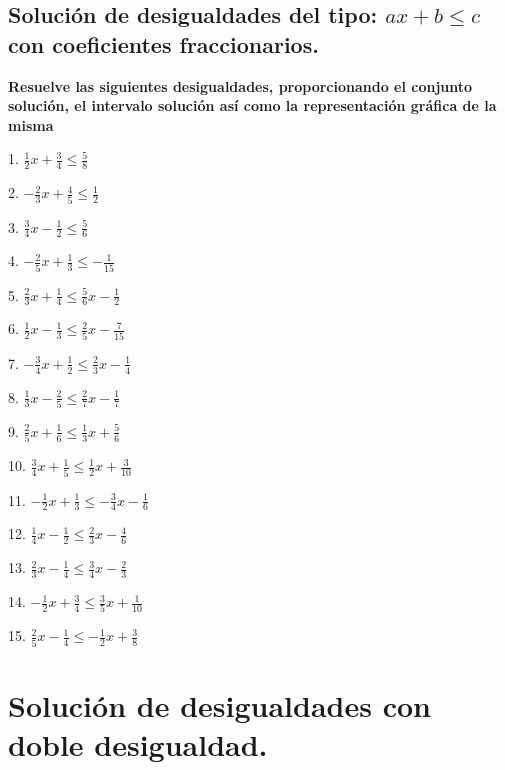 \documentclass[]{book}
\begin{document}
\subsection{\texorpdfstring{Solución de desigualdades del tipo:
\(ax+b \leq c\) con coeficientes
fraccionarios.}{Solución de desigualdades del tipo: ax+b \textbackslash{}leq c con coeficientes fraccionarios.}}\label{soluciuxf3n-de-desigualdades-del-tipo-axb-leq-c-con-coeficientes-fraccionarios.}

\textbf{Resuelve las siguientes desigualdades, proporcionando el
conjunto solución, el intervalo solución así como la representación
gráfica de la misma}

\begin{multicols}{3}
1. $\frac{1}{2}x + \frac{3}{4} \leq \frac{5}{8}$

2. $-\frac{2}{3}x + \frac{4}{5} \leq \frac{1}{2}$

3. $\frac{3}{4}x - \frac{1}{2} \leq \frac{5}{6}$

4. $-\frac{2}{5}x + \frac{1}{3} \leq -\frac{1}{15}$

5. $\frac{2}{3}x + \frac{1}{4} \leq \frac{5}{6}x - \frac{1}{2}$

6. $\frac{1}{2}x - \frac{1}{3} \leq \frac{2}{5}x - \frac{7}{15}$

7. $-\frac{3}{4}x + \frac{1}{2} \leq \frac{2}{3}x - \frac{1}{4}$

8. $\frac{1}{3}x - \frac{2}{5} \leq \frac{2}{7}x - \frac{1}{7}$

9. $\frac{2}{5}x + \frac{1}{6} \leq \frac{1}{3}x + \frac{5}{6}$

10. $\frac{3}{4}x + \frac{1}{5} \leq \frac{1}{2}x + \frac{3}{10}$

11. $-\frac{1}{2}x + \frac{1}{3} \leq -\frac{3}{4}x - \frac{1}{6}$

12. $\frac{1}{4}x - \frac{1}{2} \leq \frac{2}{3}x - \frac{4}{6}$

13. $\frac{2}{3}x - \frac{1}{4} \leq \frac{3}{4}x - \frac{2}{3}$

14. $-\frac{1}{2}x + \frac{3}{4} \leq \frac{3}{5}x + \frac{1}{10}$

15. $\frac{2}{5}x - \frac{1}{4} \leq -\frac{1}{2}x + \frac{3}{8}$
\end{multicols}

\section{Solución de desigualdades con doble
desigualdad.}\label{soluciuxf3n-de-desigualdades-con-doble-desigualdad.}
\end{document}
